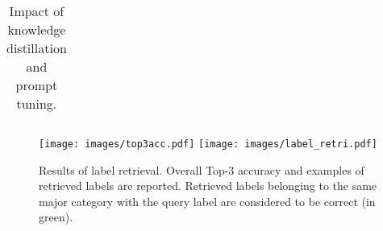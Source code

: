 \documentclass[letterpaper]{article} \usepackage{aaai23}  \usepackage{times}  \usepackage{helvet}  \usepackage{courier}  \usepackage[hyphens]{url}  \usepackage{graphicx} \urlstyle{rm} \def\UrlFont{\rm}  \usepackage{natbib}  \usepackage{caption} \frenchspacing  \setlength{\pdfpagewidth}{8.5in}  \setlength{\pdfpageheight}{11in}
\begin{document}
\begin{table}[t]
{\begin{tabular}{cc|cccc}
\bottomrule[0.1em]
\end{tabular}
}
\caption{Impact of knowledge distillation and prompt tuning.}
\label{tab:ablation}
\end{table} \begin{table}[ht]
\centering
\setlength{\tabcolsep}{6pt}
\caption{Impact of label embedding. 
For a fair comparison, we only change label embedding and train both models without knowledge distillation or prompt tuning.}
\label{tab:glove}
\end{table}  \begin{figure}[ht]
  \centering
    {\texttt{[image: images/top3acc.pdf]}}
    {\texttt{[image: images/label\_retri.pdf]}}
  \caption{Results of label retrieval. 
 Overall Top-3 accuracy and examples of retrieved labels are reported. Retrieved labels belonging to the same major category with the query label are considered to be correct (in green).
 }
  \label{fig:label_result}
\end{figure} 
\end{document}
